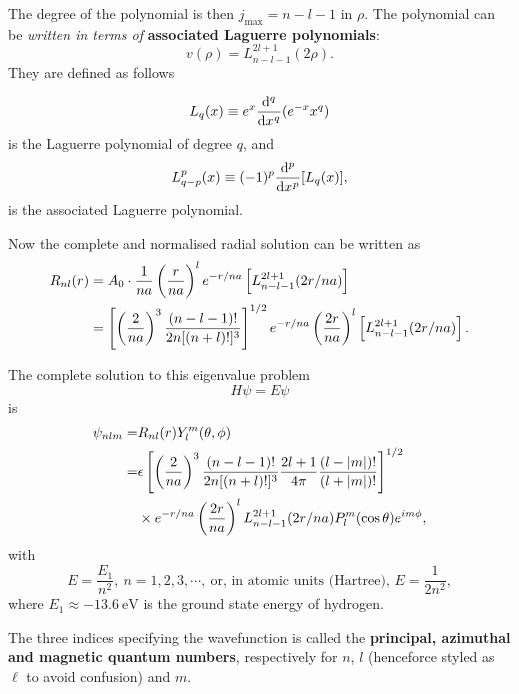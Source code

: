 The degree of the polynomial is then $j_{\text{max}}=n-l-1$ in $\rho$. 
The polynomial can be \textit{written in terms of} \textbf{associated Laguerre polynomials}:
\begin{equation}
v(\rho)=L^{2l+1}_{n-l-1}(2\rho). 
\end{equation}
They are defined as follows
\begin{defi}
\begin{equation}
L_q(x)\equiv e^x\diff*[q]{(e^{-x}x^q)}x
\end{equation}
is the Laguerre polynomial of degree $q$, and 
\begin{equation}
L^{p}_{q-p}(x)\equiv(-1)^p\diff*[p]{[L_q(x)]}x, 
\end{equation}
is the associated Laguerre polynomial. 
\end{defi}
Now the complete and normalised radial solution can be written as 
\begin{equation}
\begin{aligned}
R_{nl}(r)&=A_0\cdot\frac{1}{na}\left(\frac{r}{na} \right)^le^{-r/na}\left[L^{2l+1}_{n-l-1}(2r/na) \right] \\
&=\left[\left(\frac{2}{na}\right)^3\frac{(n-l-1)!}{2n[(n+l)!]^3} \right]^{1/2}e^{-r/na}\left(\frac{2r}{na} \right)^l\left[L^{2l+1}_{n-l-1}(2r/na) \right].
\end{aligned}
\end{equation}
\begin{prt}
The complete solution to this eigenvalue problem
\begin{equation}
H\psi=E\psi
\end{equation}
is 
\begin{equation}
\begin{split}
\psi_{nlm}=&R_{nl}(r)Y^m_l(\theta,\phi)\\
=&\epsilon\left[\left(\frac{2}{na}\right)^3\frac{(n-l-1)!}{2n[(n+l)!]^3} \frac{2l+1}{4\pi}\frac{(l-|m|)!}{(l+|m|)!} \right]^{1/2}\\
&\times e^{-r/na}\left(\frac{2r}{na} \right)^lL^{2l+1}_{n-l-1}(2r/na)P^m_l(\cos\theta)e^{im\phi}, 
\end{split}
\end{equation}
with 
\begin{equation}
E=\frac{E_1}{n^2},\ n=1,2,3,\cdots,\ \text{or, in atomic units (Hartree), }E=\frac{1}{2n^2},
\end{equation}
where $E_1\approx-13.6\ \text{eV}$ is the ground state energy of hydrogen. \par
The three indices specifying the wavefunction is called the 
\textbf{principal, azimuthal and magnetic quantum numbers}, respectively for 
$n$, $l$ (henceforce styled as $\ell$ to avoid confusion) and $m$.
\end{prt}
